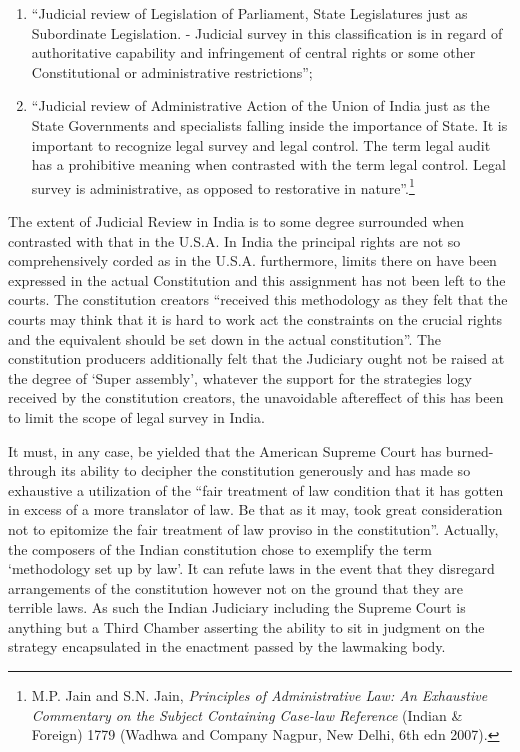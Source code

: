 \begin{multicols}{2}
\begin{enumerate}[label=\roman*)]
\item “Judicial review of Legislation of Parliament, State Legislatures just as Subordinate
Legislation. - Judicial survey in this classification is in regard of authoritative capability and
infringement of central rights or some other Constitutional or administrative restrictions”; 

\item “Judicial review of Administrative Action of the Union of India just as the State
Governments and specialists falling inside the importance of State. It is important to
recognize legal survey and legal control. The term legal audit has a prohibitive meaning when
contrasted with the term legal control. Legal survey is administrative, as opposed to
restorative in nature”.\footnote{M.P. Jain and S.N. Jain, \textit{Principles of Administrative Law: An Exhaustive Commentary on the Subject  Containing Case-law Reference} (Indian \& Foreign) 1779 (Wadhwa and Company Nagpur, New Delhi, 6th  edn 2007).}
\end{enumerate}

\vspace{-.3cm}


\vspace{-.1cm}

\noi
The extent of Judicial Review in India is to some degree surrounded when contrasted with
that in the U.S.A. In India the principal rights are not so comprehensively corded as in the
U.S.A. furthermore, limits there on have been expressed in the actual Constitution and this
assignment has not been left to the courts. The constitution creators “received this
methodology as they felt that the courts may think that it is hard to work act the constraints
on the crucial rights and the equivalent should be set down in the actual constitution”. The
constitution producers additionally felt that the Judiciary ought not be raised at the degree of
‘Super assembly', whatever the support for the strategies logy received by the constitution
creators, the unavoidable aftereffect of this has been to limit the scope of legal survey in
India.

\vspace{-.1cm}

\noi
It must, in any case, be yielded that the American Supreme Court has burned-through its
ability to decipher the constitution generously and has made so exhaustive a utilization of the
“fair treatment of law condition that it has gotten in excess of a more translator of law. Be
that as it may, took great consideration not to epitomize the fair treatment of law proviso in
the constitution”. Actually, the composers of the Indian constitution chose to exemplify the
term ‘methodology set up by law'. It can refute laws in the event that they disregard arrangements of the constitution however not on the ground that they are terrible laws. As
such the Indian Judiciary including the Supreme Court is anything but a Third Chamber
asserting the ability to sit in judgment on the strategy encapsulated in the enactment passed
by the lawmaking body.


\end{multicols}
